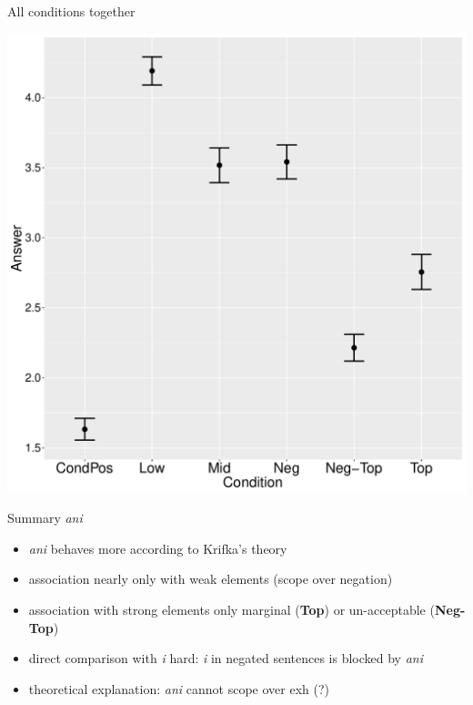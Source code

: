 \documentclass[ignorenonframetext,]{beamer}
\providecommand{\tightlist}{%
  \setlength{\itemsep}{0pt}\setlength{\parskip}{0pt}}
\newcommand{\cond}[1]{\textbf{#1}}
\begin{document}
\begin{frame}{All conditions together}

\begin{center}
\includegraphics[scale=0.3]{exp1-ani-part_1-2-errorbars.pdf}
\end{center}

\end{frame}

\begin{frame}{Summary \emph{ani}}

\begin{itemize}
\tightlist
\item
  \emph{ani} behaves more according to Krifka's theory
\item
  association nearly only with weak elements (scope over negation)
\item
  association with strong elements only marginal (\cond{Top}) or
  un-acceptable (\cond{Neg-Top})
\item
  direct comparison with \emph{i} hard: \emph{i} in negated sentences is
  blocked by \emph{ani}
\item
  theoretical explanation: \emph{ani} cannot scope over exh (?)
\end{itemize}

\end{frame}
\end{document}
